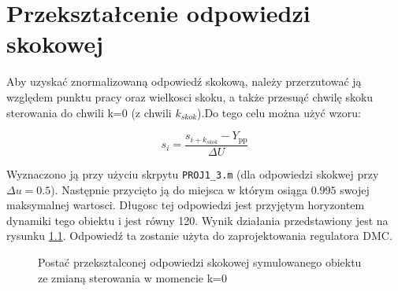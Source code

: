 \chapter{Przekształcenie odpowiedzi skokowej}
\label{zad3}

\label{zad3_postac_ogolna}
Aby uzyskać znormalizowaną odpowiedź skokową, należy przerzutować ją względem punktu pracy oraz wielkosci skoku, a także przesuąć chwilę skoku sterowania do chwili k=\num{0} (z chwili $k_{skok}$).Do tego celu można użyć wzoru: 

\begin{equation}
    s_{i} = \frac{s_{i+k_{skok}} - Y_{\mathrm{pp}}}{\Delta U}
    \label{zad3_norm_odp_skok_wzor}
\end{equation}

Wyznaczono ją przy użyciu skrpytu \verb+PROJ1_3.m+ (dla odpowiedzi skokwej przy $\Delta u = \num{0,5}$). Następnie przycięto ją do miejsca w którym osiąga $\num{0.995}$ swojej maksymalnej wartosci. Długosc tej odpowiedzi jest przyjętym horyzontem dynamiki tego obiektu i jest równy 120. Wynik działania przedstawiony jest na rysunku \ref{zad3_norm_odp_wykres}.
Odpowiedź ta zostanie użyta do zaprojektowania regulatora DMC.

\begin{figure}[b]
    \label{zad3_norm_odp_wykres}
    \centering
    \caption{Postać przeksztalconej odpowiedzi skokowej symulowanego obiektu ze zmianą sterowania w momencie k=0}
\end{figure}




